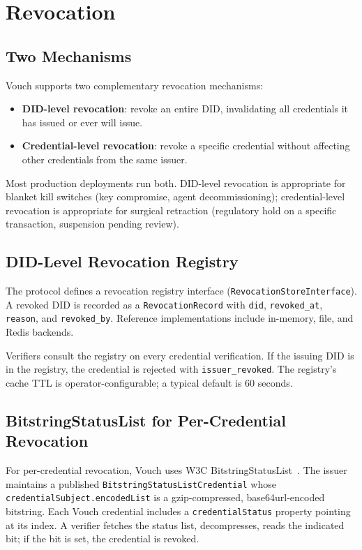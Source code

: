 \documentclass[11pt,a4paper]{article}
\begin{document}
\section{Revocation}
\label{sec:revocation}

\subsection{Two Mechanisms}

Vouch supports two complementary revocation mechanisms:

\begin{itemize}[leftmargin=*]
\item \textbf{DID-level revocation}: revoke an entire DID, invalidating all credentials it has issued or ever will issue.
\item \textbf{Credential-level revocation}: revoke a specific credential without affecting other credentials from the same issuer.
\end{itemize}

Most production deployments run both. DID-level revocation is appropriate for blanket kill switches (key compromise, agent decommissioning); credential-level revocation is appropriate for surgical retraction (regulatory hold on a specific transaction, suspension pending review).

\subsection{DID-Level Revocation Registry}

The protocol defines a revocation registry interface (\verb|RevocationStoreInterface|). A revoked DID is recorded as a \verb|RevocationRecord| with \verb|did|, \verb|revoked_at|, \verb|reason|, and \verb|revoked_by|. Reference implementations include in-memory, file, and Redis backends.

Verifiers consult the registry on every credential verification. If the issuing DID is in the registry, the credential is rejected with \verb|issuer_revoked|. The registry's cache TTL is operator-configurable; a typical default is 60 seconds.

\subsection{BitstringStatusList for Per-Credential Revocation}

For per-credential revocation, Vouch uses W3C BitstringStatusList~\cite{w3cbsl}. The issuer maintains a published \texttt{BitstringStatusListCredential} whose \verb|credentialSubject.encodedList| is a gzip-compressed, base64url-encoded bitstring. Each Vouch credential includes a \verb|credentialStatus| property pointing at its index. A verifier fetches the status list, decompresses, reads the indicated bit; if the bit is set, the credential is revoked.
\end{document}
